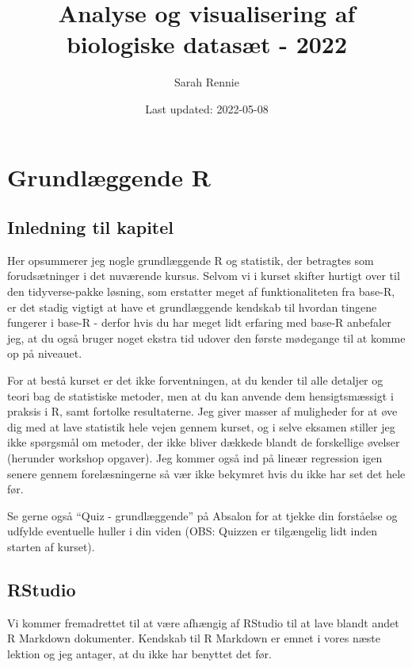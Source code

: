 \documentclass[
]{book}
\title{Analyse og visualisering af biologiske datasæt - 2022}
\author{Sarah Rennie}
\date{Last updated: 2022-05-08}
\begin{document}
\maketitle

{
\setcounter{tocdepth}{1}
\tableofcontents
}
\hypertarget{baser}{%
\chapter{Grundlæggende R}\label{baser}}

\hypertarget{inledning-til-kapitel}{%
\section{Inledning til kapitel}\label{inledning-til-kapitel}}

Her opsummerer jeg nogle grundlæggende R og statistik, der betragtes som forudsætninger i det nuværende kursus. Selvom vi i kurset skifter hurtigt over til den tidyverse-pakke løsning, som erstatter meget af funktionaliteten fra base-R, er det stadig vigtigt at have et grundlæggende kendskab til hvordan tingene fungerer i base-R - derfor hvis du har meget lidt erfaring med base-R anbefaler jeg, at du også bruger noget ekstra tid udover den første mødegange til at komme op på niveauet.

For at bestå kurset er det ikke forventningen, at du kender til alle detaljer og teori bag de statistiske metoder, men at du kan anvende dem hensigtsmæssigt i praksis i R, samt fortolke resultaterne. Jeg giver masser af muligheder for at øve dig med at lave statistik hele vejen gennem kurset, og i selve eksamen stiller jeg ikke spørgsmål om metoder, der ikke bliver dækkede blandt de forskellige øvelser (herunder workshop opgaver). Jeg kommer også ind på lineær regression igen senere gennem forelæsningerne så vær ikke bekymret hvis du ikke har set det hele før.

Se gerne også ``Quiz - grundlæggende'' på Absalon for at tjekke din forståelse og udfylde eventuelle huller i din viden (OBS: Quizzen er tilgængelig lidt inden starten af kurset).

\hypertarget{rstudio}{%
\section{RStudio}\label{rstudio}}

Vi kommer fremadrettet til at være afhængig af RStudio til at lave blandt andet R Markdown dokumenter. Kendskab til R Markdown er emnet i vores næste lektion og jeg antager, at du ikke har benyttet det før.
\end{document}
